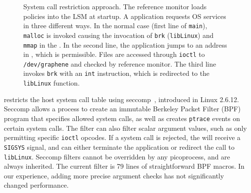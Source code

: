 
\begin{figure}[t!]
\centering
\footnotesize
\caption[\sysname{}'s system call restriction approach]
{System call restriction approach. The reference monitor loads policies into the LSM at startup.  A \sysname{} application requests OS services in three different ways. 
In the normal case (first line of {\tt main}), {\tt malloc} is invoked causing the invocation of {\tt brk} ({\tt libLinux}) and {\tt mmap} in the \pal{}. In the second line, the application jumps to an address in \pal{}, which is permissible.
Files are accessed through {\tt ioctl} to {\tt /dev/graphene} and checked by reference monitor.
The third line invokes {\tt brk} with an {\tt int} instruction, which is redirected to the {\tt libLinux} function.}
\label{fig:graphene:syscall_restriction}
\end{figure}



\sysname{} restricts the host system call table 
using seccomp~\citep{seccomp}, introduced in Linux 2.6.12.
Seccomp allows a process to create an immutable Berkeley Packet Filter (BPF) program
that specifies allowed system calls, as well as creates {\tt ptrace} 
events on certain system calls.
The filter can also filter scalar argument values,
such as only permitting specific {\tt ioctl} opcodes.
If a system call is rejected, the \pal{} will receive a {\tt SIGSYS} signal,
and can either terminate the application or redirect the 
call to {\tt libLinux}.
Seccomp filters cannot be overridden by any picoprocess,
and are always inherited.
The current \sysname{} filter is 79 lines 
of straightforward BPF macros.  In our experience, adding more precise argument checks
has not significantly changed performance.

